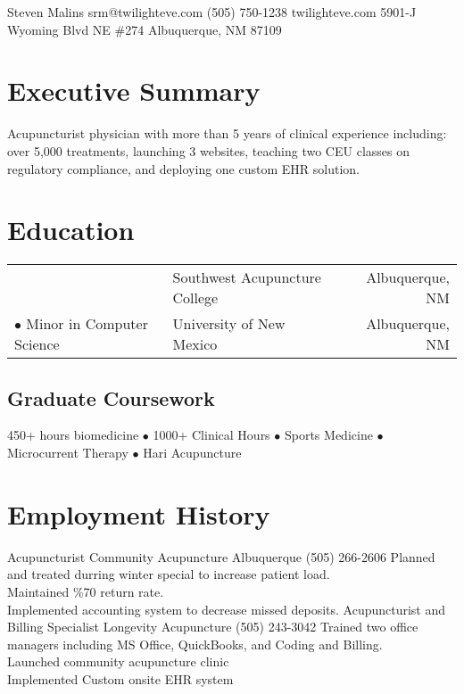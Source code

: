 \documentclass{myres}
\makeatletter
\newcommand{\myfname}{Steven}
\newcommand{\mylname}{Malins}
\newcommand{\myemail}{srm@twilighteve.com}
\newcommand{\myweb}{twilighteve.com}
\newcommand{\myphone}{(505) 750-1238}
\newcommand{\myaddressA}{5901-J Wyoming Blvd NE \#274}
\newcommand{\myaddressB}{Albuquerque, NM 87109}
\makeatother
\begin{document}
\pagestyle{empty}

\mktop
{\myfname}
{\mylname}
{\myemail}
{\myphone}
{\myweb}
{\myaddressA}
{\myaddressB}

\myendsec
\section{Executive Summary}
\vspace{-.5em}
Acupuncturist physician with more than 5 years of clinical experience including: over 5,000 treatments, launching 3 websites, teaching two CEU classes on regulatory compliance, and deploying one custom EHR solution.
\myendsec

\section{Education}
\vspace{-1em}
\begin{tabularx}{\textwidth}{@{} l l R}
 & Southwest Acupuncture College & Albuquerque, NM\\
 $\bullet$ Minor in Computer Science & University of New Mexico & Albuquerque, NM\\
\end{tabularx}
\vspace{-1em}
\subsection{Graduate Coursework}
\vspace{-.8em}
450+ hours biomedicine $\bullet$ 1000+ Clinical Hours $\bullet$ Sports Medicine $\bullet$ Microcurrent Therapy $\bullet$ Hari Acupuncture
\myendsec

\section{Employment History}
{Acupuncturist}
{Community Acupuncture Albuquerque}
{(505) 266-2606}
{
  Planned and treated durring winter special to increase patient load.\\
  Maintained \%70 return rate.\\
  Implemented accounting system to decrease missed deposits.
}
{Acupuncturist and Billing Specialist}
{Longevity Acupuncture}
{(505) 243-3042}
{
  Trained two office managers including MS Office, QuickBooks, and
  Coding and Billing.\\
  Launched community acupuncture clinic\\
  Implemented Custom onsite EHR system
}
\myendsec
\end{document}

